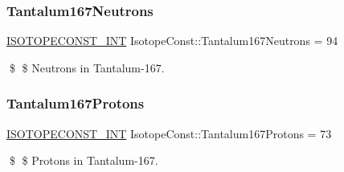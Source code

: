 \subsubsection{\texorpdfstring{Tantalum167\+Neutrons}{Tantalum167Neutrons}}
{\footnotesize\ttfamily \mbox{\hyperlink{group___isotope_const-_macros_ga5f18360b3e99483a35c32d789e62621c}{I\+S\+O\+T\+O\+P\+E\+C\+O\+N\+S\+T\+\_\+\+I\+NT}} Isotope\+Const\+::\+Tantalum167\+Neutrons = 94}

\$ \$ Neutrons in Tantalum-\/167. \mbox{\label{group___isotope_const-_tantalum-_ta167_ga6568ab401d434545328f6eeb801659f5}} 
\subsubsection{\texorpdfstring{Tantalum167\+Protons}{Tantalum167Protons}}
{\footnotesize\ttfamily \mbox{\hyperlink{group___isotope_const-_macros_ga5f18360b3e99483a35c32d789e62621c}{I\+S\+O\+T\+O\+P\+E\+C\+O\+N\+S\+T\+\_\+\+I\+NT}} Isotope\+Const\+::\+Tantalum167\+Protons = 73}

\$ \$ Protons in Tantalum-\/167. 